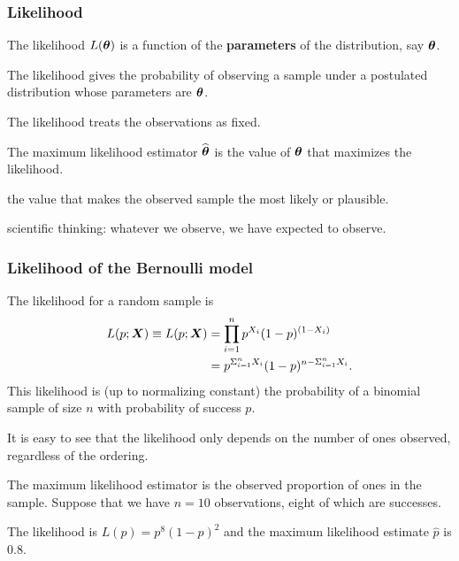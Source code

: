 \documentclass{beamer}
\begin{document}
\begin{frame}
\frametitle{Likelihood}
\bi

\item The \alert{likelihood} $L(\boldsymbol {\theta})$ is a function of the \textbf{parameters} of the distribution, say $\boldsymbol {\theta}$.

\bi \item The likelihood  gives the probability of observing a sample under a postulated distribution whose parameters are $\boldsymbol {\theta}$.
\item The likelihood treats the observations as fixed.
\ei

\item The \alert{maximum likelihood} estimator $\widehat{\boldsymbol {\theta}}$ is the value of $\boldsymbol {\theta}$ that maximizes the likelihood.
\bi \item the value that makes the observed sample the most \alert{likely} or \alert{plausible}. 
\item scientific thinking: whatever we observe, we have expected to observe.
\ei
\ei
\end{frame}
\begin{frame}[fragile]
\frametitle{Likelihood of the Bernoulli model}
The likelihood for a random sample is 
\begin{align*}
L(p; \boldsymbol {X}) \equiv L(p; \boldsymbol {X})&=\prod_{i=1}^n p^{X_i} (1-p)^{(1-X_i)}\\&= p^{\Sigma_{i=1}^n X_i}(1-p)^{n-\Sigma_{i=1}^n X_i}.
\end{align*}
% 
This likelihood is (up to normalizing constant) the probability of a binomial sample of size $n$ with probability of success $p$.
\bi
\item It is easy to see that the likelihood only depends on the number of ones observed, regardless of the ordering.
\item The maximum likelihood estimator is  the observed proportion of ones in the sample.
\ei
 Suppose that we have $n=10$ observations, eight of which are successes.
 \bi
\item The likelihood is $L(p)=p^8(1-p)^2$ and the maximum likelihood estimate $\hat{p}$ is $0.8$.
\ei
\end{frame}
\end{document}
